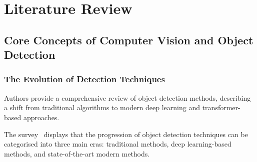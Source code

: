 \section{Literature Review}

\subsection{Core Concepts of Computer Vision and Object Detection}

\subsubsection{The Evolution of Detection Techniques}
\label{sec:evolution_of_detection_techniques}

Authors \citeauthor{zou2025comprehensive} provide a comprehensive review of
object detection methods, describing a shift from traditional algorithms to
modern deep learning and transformer-based approaches.

The survey~\citep{zou2025comprehensive} displays that the progression of object
detection techniques can be categorised into three main eras: traditional
methods, deep learning-based methods, and state-of-the-art modern methods.

